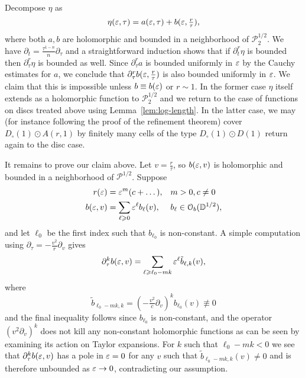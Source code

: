 \documentclass[reqno]{amsart}
\renewcommand\ge{\geqslant} \renewcommand\le{\leqslant}
\renewcommand\~[1]{\widetilde{#1}}
\def\D{{\mathbb D}}
\def\cP{{\mathcal P}} \def\cR{{\mathcal R}}
\def\cO{{\mathcal O}}
\begin{document}
Decompose $\eta$ as
\begin{equation}
\eta(\varepsilon,\tau)=a(\varepsilon,\tau)+b(\varepsilon,\tfrac{r}{\tau}),
\end{equation}
where both $a,b$ are holomorphic and bounded in a neighborhood of
$\cP_2^{1/2}$. We have
$\partial_t =\frac{\tau^{1-n}}{n} \partial_\tau$ and a straightforward
induction shows that if $\partial_t^r\eta$ is bounded then
$\partial_\tau^r\eta$ is bounded as well. Since $\partial_\tau^r a$ is
bounded uniformly in $\varepsilon$ by the Cauchy estimates for $a$, we conclude
that $\partial_\tau^r b(\varepsilon, \tfrac{r}{\tau})$ is also bounded
uniformly in $\varepsilon$. We claim that this is impossible unless
$b\equiv b(\varepsilon)$ or $r\sim 1$. In the former case $\eta$ itself extends
as a holomorphic function to $\cP_2^{1/2}$ and we return to the case
of functions on discs treated above using
Lemma~\ref{lem:log-length}. In the latter case, we may (for instance
following the proof of the refinement theorem) cover
$D_\circ(1)\odot A(r,1)$ by finitely many cells of the type
$D_\circ(1)\odot D(1)$ return again to the disc case.

It remains to prove our claim above. Let $v=\tfrac{r}{\tau}$, so
$b(\varepsilon,v)$ is holomorphic and bounded in a neighborhood of
$\cP^{1/2}$. Suppose
\begin{align}
  r(\e)&=\e^m(c+\dots),& &m>0,c\neq0 \\
  b(\e, v)&=\sum_{\ell\ge0} \e^\ell b_\ell(v),& &b_\ell\in\cO_b(\D^{1/2}),
\end{align}
and let $\ell_0$ be the first index such that $b_{\ell_0}$ is non-constant.
A simple computation using $\partial_\tau = -\frac{v^2}{r}\partial_v$ gives 
\begin{equation}
  \partial_\tau^k b(\e, v)=\sum_{\ell\ge\ell_0-mk} \e^\ell \tilde{b}_{\ell,k}(v),
\end{equation}
where
\begin{equation}
  \tilde b_{\ell_0-mk,k} = \left(-\tfrac{v^2}{c}\partial_v\right)^k b_{\ell_0}(v)\not\equiv0
\end{equation}
and the final inequality follows since $b_{\ell_0}$ is non-constant,
and the operator $(v^2\partial_v)^k$ does not kill any non-constant
holomorphic functions as can be seen by examining its action on Taylor
expansions. For $k$ such that $\ell_0-mk<0$ we see that
$\partial_\tau^kb(\varepsilon, v)$ has a pole in $\varepsilon=0$ for any $v$ such that
$\tilde b_{\ell_0-mk,k}(v)\neq0$ and is therefore unbounded as
$\varepsilon\to0$, contradicting our assumption.


\appendix
\end{document}
